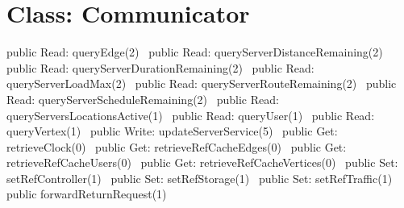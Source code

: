 \section*{Class: Communicator}
\nwenddocs{}\endmoddef{}
public \LA{}Read: queryEdge(2)~{\nwtagstyle{}}\RA{}
public \LA{}Read: queryServerDistanceRemaining(2)~{\nwtagstyle{}}\RA{}
public \LA{}Read: queryServerDurationRemaining(2)~{\nwtagstyle{}}\RA{}
public \LA{}Read: queryServerLoadMax(2)~{\nwtagstyle{}}\RA{}
public \LA{}Read: queryServerRouteRemaining(2)~{\nwtagstyle{}}\RA{}
public \LA{}Read: queryServerScheduleRemaining(2)~{\nwtagstyle{}}\RA{}
public \LA{}Read: queryServersLocationsActive(1)~{\nwtagstyle{}}\RA{}
public \LA{}Read: queryUser(1)~{\nwtagstyle{}}\RA{}
public \LA{}Read: queryVertex(1)~{\nwtagstyle{}}\RA{}
\nwendcode{}\nwdocspar
{}
\nwenddocs{}\plusendmoddef
public \LA{}Write: updateServerService(5)~{\nwtagstyle{}}\RA{}
\nwendcode{}\nwdocspar
{}
\nwenddocs{}\plusendmoddef
public \LA{}Get: retrieveClock(0)~{\nwtagstyle{}}\RA{}
public \LA{}Get: retrieveRefCacheEdges(0)~{\nwtagstyle{}}\RA{}
public \LA{}Get: retrieveRefCacheUsers(0)~{\nwtagstyle{}}\RA{}
public \LA{}Get: retrieveRefCacheVertices(0)~{\nwtagstyle{}}\RA{}
public \LA{}Set: setRefController(1)~{\nwtagstyle{}}\RA{}
public \LA{}Set: setRefStorage(1)~{\nwtagstyle{}}\RA{}
public \LA{}Set: setRefTraffic(1)~{\nwtagstyle{}}\RA{}
public \LA{}forwardReturnRequest(1)~{\nwtagstyle{}}\RA{}
\nwendcode{}\nwdocspar

